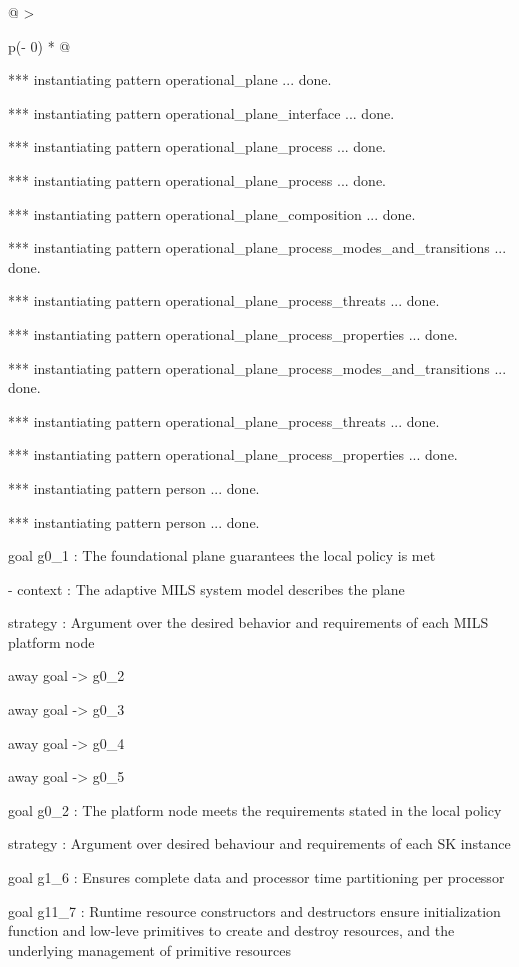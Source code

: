 \documentclass[12pt,twoside,a4paper]{article}
\begin{document}
\begin{longtable}[]{@{}
  >{\raggedright\arraybackslash}p{(\columnwidth - 0\tabcolsep) * }@{}}
\begin{minipage}[b]{\linewidth}
*** instantiating pattern operational\_plane ... done.

*** instantiating pattern operational\_plane\_interface ... done.

*** instantiating pattern operational\_plane\_process ... done.

*** instantiating pattern operational\_plane\_process ... done.

*** instantiating pattern operational\_plane\_composition ... done.

*** instantiating pattern operational\_plane\_process\_modes\_and\_transitions ... done.

*** instantiating pattern operational\_plane\_process\_threats ... done.

*** instantiating pattern operational\_plane\_process\_properties ... done.

*** instantiating pattern operational\_plane\_process\_modes\_and\_transitions ... done.

*** instantiating pattern operational\_plane\_process\_threats ... done.

*** instantiating pattern operational\_plane\_process\_properties ... done.

*** instantiating pattern person ... done.

*** instantiating pattern person ... done.

goal g0\_1 : The foundational plane guarantees the local policy is met

- context : The adaptive MILS system model describes the plane

strategy : Argument over the desired behavior and requirements of each MILS platform node

away goal -\textgreater{} g0\_2

away goal -\textgreater{} g0\_3

away goal -\textgreater{} g0\_4

away goal -\textgreater{} g0\_5

goal g0\_2 : The platform node meets the requirements stated in the local policy

strategy : Argument over desired behaviour and requirements of each SK instance

goal g1\_6 : Ensures complete data and processor time partitioning per processor

goal g11\_7 : Runtime resource constructors and destructors ensure initialization function and low-leve primitives to create and destroy resources, and the underlying management of primitive resources


\end{minipage}
\end{longtable}
\end{document}
